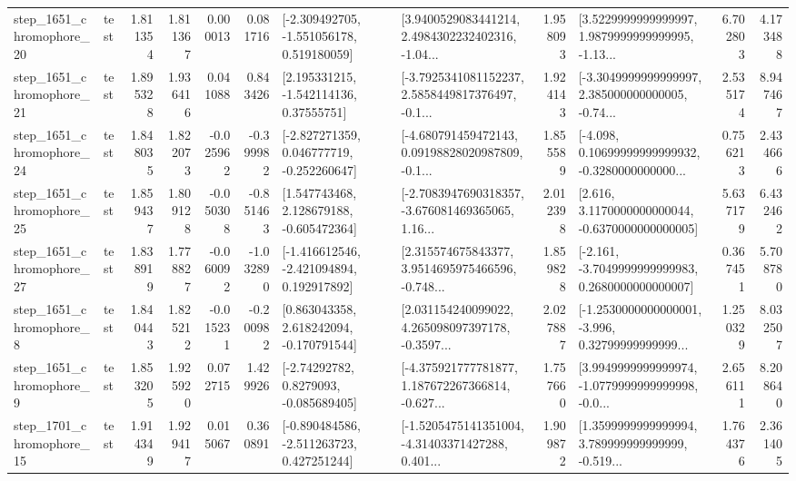 \begin{tabular}{llrrrrllrlrr}
 step\_1651\_chromophore\_20 &      test &      1.811354 &    1.811367 &      0.000013 &  0.081716 &   [-2.309492705, -1.551056178, 0.519180059] &  [3.9400529083441214, 2.4984302232402316, -1.04... &       1.958093 &  [3.5229999999999997, 1.9879999999999995, -1.13... &            6.702803 &          4.173488 \\
 step\_1651\_chromophore\_21 &      test &      1.895328 &    1.936416 &      0.041088 &  0.843426 &     [2.195331215, -1.542114136, 0.37555751] &  [-3.7925341081152237, 2.5858449817376497, -0.1... &       1.924143 &  [-3.3049999999999997, 2.385000000000005, -0.74... &            2.535174 &          8.947467 \\
 step\_1651\_chromophore\_24 &      test &      1.848035 &    1.822073 &     -0.025962 & -0.399982 &   [-2.827271359, 0.046777719, -0.252260647] &  [-4.680791459472143, 0.09198828020987809, -0.1... &       1.855589 &  [-4.098, 0.10699999999999932, -0.3280000000000... &            0.756213 &          2.434666 \\
 step\_1651\_chromophore\_25 &      test &      1.859437 &    1.809128 &     -0.050308 & -0.851463 &    [1.547743468, 2.128679188, -0.605472364] &  [-2.7083947690318357, -3.676081469365065, 1.16... &       2.012398 &   [2.616, 3.1170000000000044, -0.6370000000000005] &            5.637179 &          6.432462 \\
 step\_1651\_chromophore\_27 &      test &      1.838919 &    1.778827 &     -0.060092 & -1.032890 &   [-1.416612546, -2.421094894, 0.192917892] &  [2.315574675843377, 3.9514695975466596, -0.748... &       1.859828 &  [-2.161, -3.7049999999999983, 0.2680000000000007] &            0.367451 &          5.708780 \\
  step\_1651\_chromophore\_8 &      test &      1.840443 &    1.825212 &     -0.015231 & -0.200982 &    [0.863043358, 2.618242094, -0.170791544] &  [2.031154240099022, 4.265098097397178, -0.3597... &       2.027887 &  [-1.2530000000000001, -3.996, 0.32799999999999... &            1.250329 &          8.032507 \\
  step\_1651\_chromophore\_9 &      test &      1.853205 &    1.925920 &      0.072715 &  1.429926 &      [-2.74292782, 0.8279093, -0.085689405] &  [-4.375921777781877, 1.187672267366814, -0.627... &       1.757660 &  [3.9949999999999974, -1.0779999999999998, -0.0... &            2.656111 &          8.208640 \\
 step\_1701\_chromophore\_15 &      test &      1.914349 &    1.929417 &      0.015067 &  0.360891 &   [-0.890484586, -2.511263723, 0.427251244] &  [-1.5205475141351004, -4.31403371427288, 0.401... &       1.909872 &  [1.3599999999999994, 3.789999999999999, -0.519... &            1.764376 &          2.361405 \\

\end{tabular}
